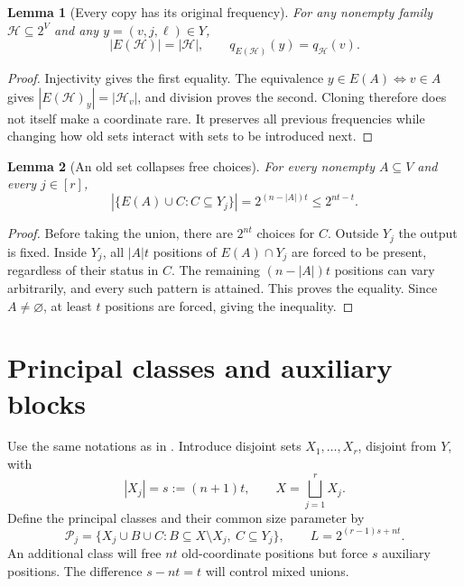 \documentclass[11pt]{article}
\newtheorem{lemma}[lemma]{Lemma}
\newcommand{\Pp}{\mathcal{P}}
\newcommand{\<}{\langle}
\renewcommand{\>}{\rangle}
\newcommand{\Hh}{\mathcal{H}}
\numberwithin{equation}{section}
\begin{document}
\begin{lemma}[Every copy has its original frequency]\label{lem:clone-frequency}
For any nonempty family $\Hh\subseteq2^V$ and any $y=(v,j,\ell)\in Y$,
\[
 |E(\Hh)|=|\Hh|,\qquad q_{E(\Hh)}(y)=q_{\Hh}(v).
\]
\end{lemma}
\begin{proof}
Injectivity gives the first equality. The equivalence
$y\in E(A)\Longleftrightarrow v\in A$ gives
$|E(\Hh)_y|=|\Hh_v|$, and division proves the second.
Cloning therefore does not itself make a coordinate rare. It preserves all
previous frequencies while changing how old sets interact with sets to be
introduced next.
\end{proof}

\begin{lemma}[An old set collapses free choices]\label{lem:clone-collapse}
For every nonempty $A\subseteq V$ and every $j\in[r]$,
\begin{equation}\label{eq:clone-collapse}
 \left|\{E(A)\cup C:C\subseteq Y_j\}\right|
 =2^{(n-|A|)t}\le2^{nt-t}.
\end{equation}
\end{lemma}
\begin{proof}
Before taking the union, there are $2^{nt}$ choices for $C$. Outside $Y_j$
the output is fixed. Inside $Y_j$, all $|A|t$ positions of $E(A)\cap Y_j$
are forced to be present, regardless of their status in $C$. The remaining
$(n-|A|)t$ positions can vary arbitrarily, and every such pattern is attained.
This proves the equality. Since $A\ne\varnothing$, at least $t$ positions
are forced, giving the inequality.
\end{proof}

\section{Principal classes and auxiliary blocks}\label{sec:principal}
Use the same notations as in . Introduce disjoint sets
$X_1,\ldots,X_r$, disjoint from $Y$, with
\[
 |X_j|=s:=(n+1)t,\qquad X=\bigsqcup_{j=1}^rX_j.
\]
Define the principal classes and their common size parameter by
\begin{equation}\label{eq:principal}
 \Pp_j=\{X_j\cup B\cup C:B\subseteq X\setminus X_j,
                               \ C\subseteq Y_j\},\qquad
 L=2^{(r-1)s+nt}.
\end{equation}
An additional class will free $nt$ old-coordinate positions but force $s$
auxiliary positions. The difference $s-nt=t$ will control mixed unions.
\end{document}
